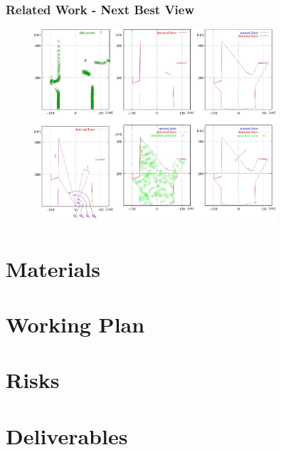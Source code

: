 \documentclass[t]{beamer} %
\begin{document}
\begin{frame}
	\frametitle{ Related Work - Next Best View}
	\begin{figure}[h]
		\includegraphics[width=0.8\textwidth]{src/nbv.png}
	\end{figure}
	\centering
	\scriptsize \cite{surmann2003autonomous}
\end{frame}

\section{Materials}


\section{Working Plan}


\section{Risks}


\section{Deliverables}

\end{document}
